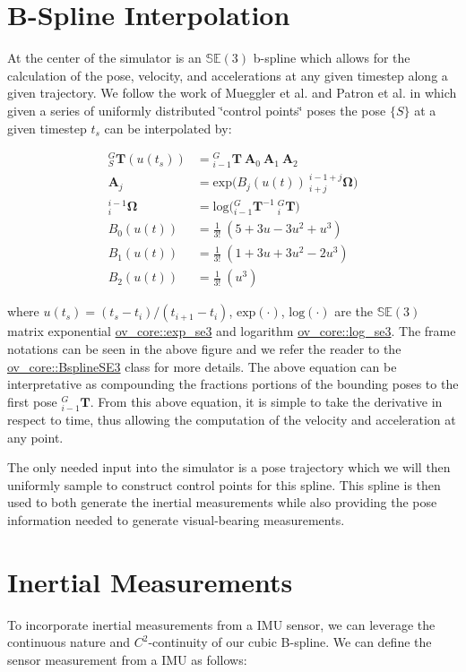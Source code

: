 \hypertarget{simulation_sim-bspline}{}\section{B-\/\+Spline Interpolation}\label{simulation_sim-bspline}


At the center of the simulator is an $\mathbb{SE}(3)$ b-\/spline which allows for the calculation of the pose, velocity, and accelerations at any given timestep along a given trajectory. We follow the work of Mueggler et al. \cite{Mueggler2018TRO} and Patron et al. \cite{Patron2015IJCV} in which given a series of uniformly distributed \char`\"{}control points\char`\"{} poses the pose $\{S\}$ at a given timestep $t_s$ can be interpolated by\+:

\begin{align*} {}^{G}_{S}\mathbf{T}(u(t_s)) &= {}^{G}_{i-1}\mathbf{T}~\mathbf{A}_0~\mathbf{A}_1~\mathbf{A}_2 \label{eq:poseinterp} \\[0.75em] \mathbf{A}_j &= \mathrm{exp}\Big({B}_j(u(t))~{}^{i-1+j}_{i+j}\mathbf{\Omega} \Big) \\ {}^{i-1}_{i}\mathbf{\Omega} &= \mathrm{log}\Big( {}^{G}_{i-1}\mathbf{T}^{-1}~{}^{G}_{i}\mathbf{T} \Big) \\[0.75em] {B}_0(u(t)) &= \frac{1}{3!}~(5+3u-3u^2+u^3) \\ {B}_1(u(t)) &= \frac{1}{3!}~(1+3u+3u^2-2u^3) \\ {B}_2(u(t)) &= \frac{1}{3!}~(u^3) \end{align*}

where $u(t_s)=(t_s-t_i)/(t_{i+1}-t_i)$, $\mathrm{exp}(\cdot)$, $\mathrm{log}(\cdot)$ are the $\mathbb{SE}(3)$ matrix exponential \hyperlink{namespaceov__core_a8907fdb4273f23741299fb23a1c1f572}{ov\+\_\+core\+::exp\+\_\+se3} and logarithm \hyperlink{namespaceov__core_aaf3626f4ed6392b8b0b0d0a75ff08a61}{ov\+\_\+core\+::log\+\_\+se3}. The frame notations can be seen in the above figure and we refer the reader to the \hyperlink{classov__core_1_1BsplineSE3}{ov\+\_\+core\+::\+Bspline\+S\+E3} class for more details. The above equation can be interpretative as compounding the fractions portions of the bounding poses to the first pose ${}^{G}_{i-1}\mathbf{T}$. From this above equation, it is simple to take the derivative in respect to time, thus allowing the computation of the velocity and acceleration at any point.

The only needed input into the simulator is a pose trajectory which we will then uniformly sample to construct control points for this spline. This spline is then used to both generate the inertial measurements while also providing the pose information needed to generate visual-\/bearing measurements.\hypertarget{simulation_sim-inertial}{}\section{Inertial Measurements}\label{simulation_sim-inertial}
To incorporate inertial measurements from a I\+MU sensor, we can leverage the continuous nature and $C^2$-\/continuity of our cubic B-\/spline. We can define the sensor measurement from a I\+MU as follows\+:

